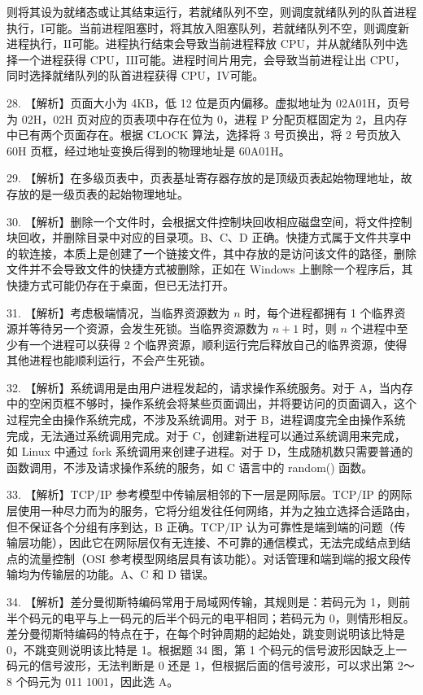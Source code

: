 \documentclass[UTF8,11pt]{ctexart}
\begin{document}
则将其设为就绪态或让其结束运行，若就绪队列不空，则调度就绪队列的队首进程执行，\(\displaystyle \mathrm{I}\)可能。当前进程阻塞时，将其放入阻塞队列，若就绪队列不空，则调度新进程执行，\(\displaystyle \mathrm{II}\)可能。进程执行结束会导致当前进程释放 CPU，并从就绪队列中选择一个进程获得 CPU，\(\displaystyle \mathrm{III}\)可能。进程时间片用完，会导致当前进程让出 CPU，同时选择就绪队列的队首进程获得 CPU，\(\displaystyle \mathrm{IV}\)可能。


28. 【解析】页面大小为 4KB，低 12 位是页内偏移。虚拟地址为 02A01H，页号为 02H，02H 页对应的页表项中存在位为 0，进程 P 分配页框固定为 2，且内存中已有两个页面存在。根据 CLOCK 算法，选择将 3 号页换出，将 2 号页放入 60H 页框，经过地址变换后得到的物理地址是 60A01H。


29. 【解析】在多级页表中，页表基址寄存器存放的是顶级页表起始物理地址，故存放的是一级页表的起始物理地址。


30. 【解析】删除一个文件时，会根据文件控制块回收相应磁盘空间，将文件控制块回收，并删除目录中对应的目录项。B、C、D 正确。快捷方式属于文件共享中的软连接，本质上是创建了一个链接文件，其中存放的是访问该文件的路径，删除文件并不会导致文件的快捷方式被删除，正如在 Windows 上删除一个程序后，其快捷方式可能仍存在于桌面，但已无法打开。


31. 【解析】考虑极端情况，当临界资源数为 \(\displaystyle n\) 时，每个进程都拥有 1 个临界资源并等待另一个资源，会发生死锁。当临界资源数为 \(\displaystyle n+1\) 时，则 \(\displaystyle n\) 个进程中至少有一个进程可以获得 2 个临界资源，顺利运行完后释放自己的临界资源，使得其他进程也能顺利运行，不会产生死锁。


32. 【解析】系统调用是由用户进程发起的，请求操作系统服务。对于 A，当内存中的空闲页框不够时，操作系统会将某些页面调出，并将要访问的页面调入，这个过程完全由操作系统完成，不涉及系统调用。对于 B，进程调度完全由操作系统完成，无法通过系统调用完成。对于 C，创建新进程可以通过系统调用来完成，如 Linux 中通过 fork 系统调用来创建子进程。对于 D，生成随机数只需要普通的函数调用，不涉及请求操作系统的服务，如 C 语言中的 random() 函数。


33. 【解析】TCP/IP 参考模型中传输层相邻的下一层是网际层。TCP/IP 的网际层使用一种尽力而为的服务，它将分组发往任何网络，并为之独立选择合适路由，但不保证各个分组有序到达，B 正确。TCP/IP 认为可靠性是端到端的问题（传输层功能），因此它在网际层仅有无连接、不可靠的通信模式，无法完成结点到结点的流量控制（OSI 参考模型网络层具有该功能）。对话管理和端到端的报文段传输均为传输层的功能。A、C 和 D 错误。


34. 【解析】差分曼彻斯特编码常用于局域网传输，其规则是：若码元为 1，则前半个码元的电平与上一码元的后半个码元的电平相同；若码元为 0，则情形相反。差分曼彻斯特编码的特点在于，在每个时钟周期的起始处，跳变则说明该比特是 0，不跳变则说明该比特是 1。根据题 34 图，第 1 个码元的信号波形因缺乏上一码元的信号波形，无法判断是 0 还是 1，但根据后面的信号波形，可以求出第 2～8 个码元为 011 1001，因此选 A。
\end{document}
